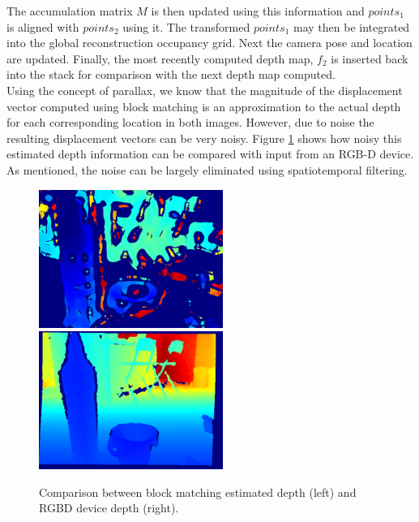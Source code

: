 The accumulation matrix $M$ is then updated using this information and $points_1$ is aligned with $points_2$ using it. The transformed $points_1$ may then be integrated into the global reconstruction occupancy grid. Next the camera pose and location are updated. Finally, the most recently computed depth map, $f_2$ is inserted back into the stack for comparison with the next depth map computed. \\ 

Using the concept of parallax, we know that the magnitude of the displacement vector computed using block matching is an approximation to the actual depth for each corresponding location in both images. However, due to noise the resulting displacement vectors can be very noisy. Figure \ref{fig:DepthGenerationExample} shows how noisy this estimated depth information can be compared with input from an RGB-D device. As mentioned, the noise can be largely eliminated using spatiotemporal filtering. \\


\begin{figure}[!htb]
\centering
\includegraphics[width=6cm]{images/methodology/FVR/home_depth_frame_mono}
\includegraphics[width=6cm]{images/methodology/FVR/home_depth_frame}
\caption{Comparison between block matching estimated depth (left) and RGBD device depth (right).}
\label{fig:DepthGenerationExample}
\end{figure}
 
